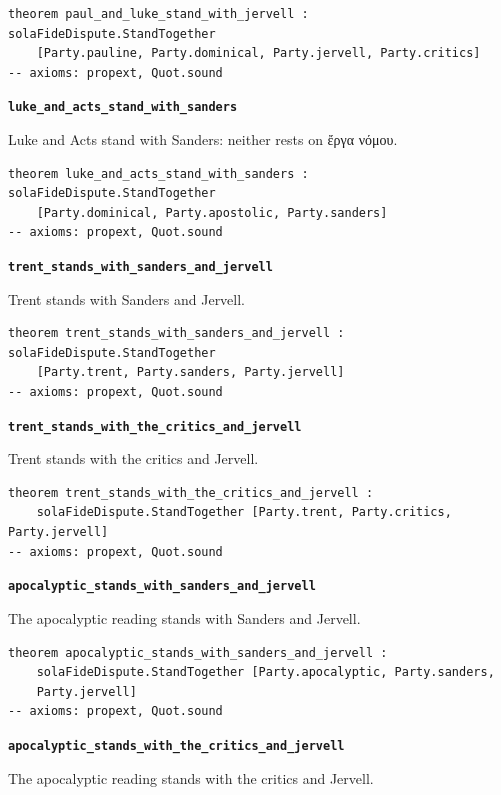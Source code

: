 \documentclass[11pt]{article}
\begin{document}
{\small\begin{verbatim}
theorem paul_and_luke_stand_with_jervell : solaFideDispute.StandTogether
    [Party.pauline, Party.dominical, Party.jervell, Party.critics]
-- axioms: propext, Quot.sound
\end{verbatim}}
\par\medskip\noindent\textbf{\texttt{luke\_\allowbreak{}and\_\allowbreak{}acts\_\allowbreak{}stand\_\allowbreak{}with\_\allowbreak{}sanders}}\par\nobreak\noindent
Luke and Acts stand with Sanders: neither rests on ἔργα νόμου.

{\small\begin{verbatim}
theorem luke_and_acts_stand_with_sanders : solaFideDispute.StandTogether
    [Party.dominical, Party.apostolic, Party.sanders]
-- axioms: propext, Quot.sound
\end{verbatim}}
\par\medskip\noindent\textbf{\texttt{trent\_\allowbreak{}stands\_\allowbreak{}with\_\allowbreak{}sanders\_\allowbreak{}and\_\allowbreak{}jervell}}\par\nobreak\noindent
Trent stands with Sanders and Jervell.

{\small\begin{verbatim}
theorem trent_stands_with_sanders_and_jervell : solaFideDispute.StandTogether
    [Party.trent, Party.sanders, Party.jervell]
-- axioms: propext, Quot.sound
\end{verbatim}}
\par\medskip\noindent\textbf{\texttt{trent\_\allowbreak{}stands\_\allowbreak{}with\_\allowbreak{}the\_\allowbreak{}critics\_\allowbreak{}and\_\allowbreak{}jervell}}\par\nobreak\noindent
Trent stands with the critics and Jervell.

{\small\begin{verbatim}
theorem trent_stands_with_the_critics_and_jervell :
    solaFideDispute.StandTogether [Party.trent, Party.critics, Party.jervell]
-- axioms: propext, Quot.sound
\end{verbatim}}
\par\medskip\noindent\textbf{\texttt{apocalyptic\_\allowbreak{}stands\_\allowbreak{}with\_\allowbreak{}sanders\_\allowbreak{}and\_\allowbreak{}jervell}}\par\nobreak\noindent
The apocalyptic reading stands with Sanders and Jervell.

{\small\begin{verbatim}
theorem apocalyptic_stands_with_sanders_and_jervell :
    solaFideDispute.StandTogether [Party.apocalyptic, Party.sanders,
    Party.jervell]
-- axioms: propext, Quot.sound
\end{verbatim}}
\par\medskip\noindent\textbf{\texttt{apocalyptic\_\allowbreak{}stands\_\allowbreak{}with\_\allowbreak{}the\_\allowbreak{}critics\_\allowbreak{}and\_\allowbreak{}jervell}}\par\nobreak\noindent
The apocalyptic reading stands with the critics and Jervell.
\end{document}
